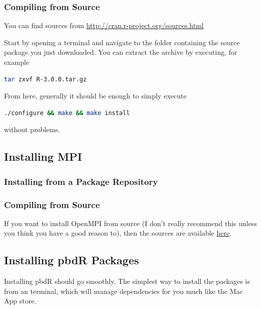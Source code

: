 \subsubsection{Compiling from Source}

You can find  sources from \url{http://cran.r-project.org/sources.html}

Start by opening a terminal and navigate to the folder containing the  source package you just downloaded.  You can extract the archive by executing, for example
\begin{lstlisting}[language=sh]
tar zxvf R-3.0.0.tar.gz
\end{lstlisting}

From here, generally it should be enough to simply execute
\begin{lstlisting}[language=sh]
./configure && make && make install
\end{lstlisting}
without problems.









\subsection{Installing MPI}

\subsubsection{Installing from a Package Repository}





\subsubsection{Compiling from Source}

If you want to install OpenMPI from source (I don't really recommend this unless you think you have a good reason to), then the sources are available \href{http://www.open-mpi.org/software/ompi/v1.6/}{here}.








\subsection{Installing pbdR Packages}
Installing pbdR should go smoothly.  The simplest way to install the packages is from an  terminal, which will manage dependencies for you much like the Mac App store.


